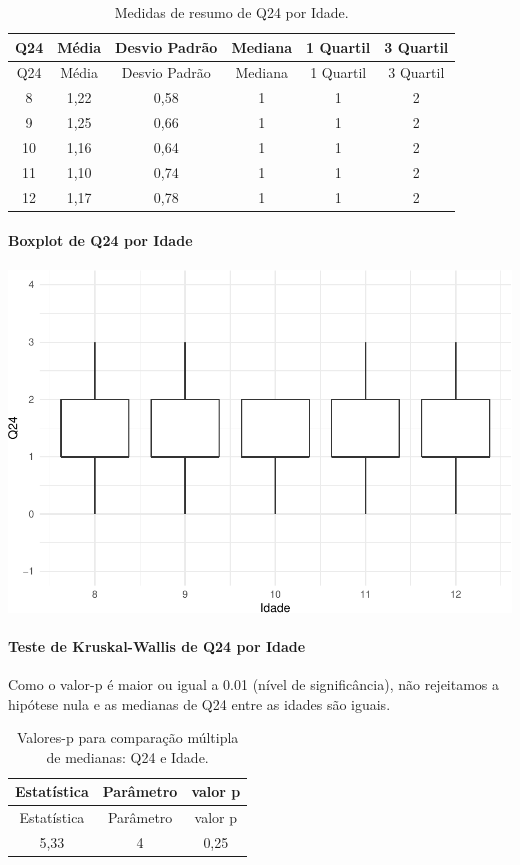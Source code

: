 \documentclass[]{article}
\let\oldparagraph\paragraph
\renewcommand{\paragraph}[1]{\oldparagraph{#1}\mbox{}}
\begin{document}
\begin{longtable}[]{@{}cccccc@{}}
\caption{\label{tab:unnamed-chunk-627}Medidas de resumo de Q24 por Idade.}\tabularnewline
\toprule
Q24 & Média & Desvio Padrão & Mediana & 1 Quartil & 3 Quartil\tabularnewline
\midrule
\endfirsthead
\toprule
Q24 & Média & Desvio Padrão & Mediana & 1 Quartil & 3 Quartil\tabularnewline
\midrule
\endhead
8 & 1,22 & 0,58 & 1 & 1 & 2\tabularnewline
9 & 1,25 & 0,66 & 1 & 1 & 2\tabularnewline
10 & 1,16 & 0,64 & 1 & 1 & 2\tabularnewline
11 & 1,10 & 0,74 & 1 & 1 & 2\tabularnewline
12 & 1,17 & 0,78 & 1 & 1 & 2\tabularnewline
\bottomrule
\end{longtable}

\hypertarget{boxplot-de-q24-por-idade}{%
\paragraph{Boxplot de Q24 por Idade}\label{boxplot-de-q24-por-idade}}

\begin{center}\includegraphics[width=0.75\linewidth]{relatorio_covid19_files/figure-latex/unnamed-chunk-628-1} \end{center}

\hypertarget{teste-de-kruskal-wallis-de-q24-por-idade}{%
\paragraph{Teste de Kruskal-Wallis de Q24 por Idade}\label{teste-de-kruskal-wallis-de-q24-por-idade}}

Como o valor-p é maior ou igual a 0.01 (nível de significância), não rejeitamos a hipótese nula e as medianas de Q24 entre as idades são iguais.

\begin{longtable}[]{@{}ccc@{}}
\caption{\label{tab:unnamed-chunk-630}Valores-p para comparação múltipla de medianas: Q24 e Idade.}\tabularnewline
\toprule
Estatística & Parâmetro & valor p\tabularnewline
\midrule
\endfirsthead
\toprule
Estatística & Parâmetro & valor p\tabularnewline
\midrule
\endhead
5,33 & 4 & 0,25\tabularnewline
\bottomrule
\end{longtable}
\end{document}
